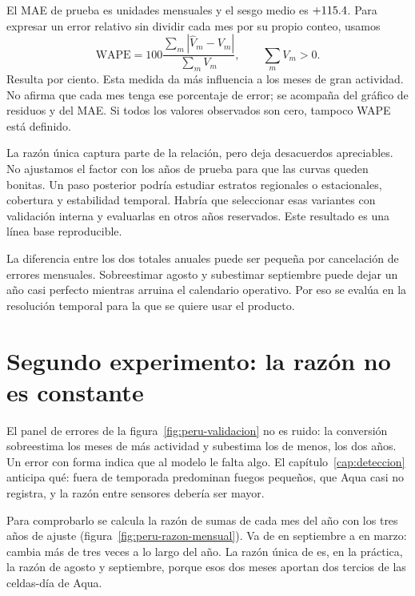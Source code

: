 El MAE de prueba es \PeruMAE{} unidades mensuales y el sesgo medio es
$+\num{115.4}{}$. Para expresar un error relativo sin dividir cada mes por su propio
conteo, usamos
\begin{equation}\label{eq:wape}
 \mathrm{WAPE}=100\frac{\sum_m|\widehat V_m-V_m|}{\sum_m V_m},\qquad \sum_m V_m>0.
\end{equation}
Resulta \PeruWAPE{} por ciento. Esta medida da más influencia a los meses de gran
actividad. No afirma que cada mes tenga ese porcentaje de error; se acompaña del
gráfico de residuos y del MAE. Si todos los valores observados son cero, tampoco WAPE
está definido.

\begin{atencion}
La razón única captura parte de la relación, pero deja desacuerdos apreciables. No
ajustamos el factor con los años de prueba para que las curvas queden bonitas. Un paso
posterior podría estudiar estratos regionales o estacionales, cobertura y estabilidad
temporal. Habría que seleccionar esas variantes con validación interna y evaluarlas en
otros años reservados. Este resultado es una línea base reproducible.
\end{atencion}

La diferencia entre los dos totales anuales puede ser pequeña por cancelación de
errores mensuales. Sobreestimar agosto y subestimar septiembre puede dejar un año casi
perfecto mientras arruina el calendario operativo. Por eso se evalúa en la resolución
temporal para la que se quiere usar el producto.

\FloatBarrier
\section{Segundo experimento: la razón no es constante}\label{sec:peru-modelos}

El panel de errores de la figura~\ref{fig:peru-validacion} no es ruido: la conversión
sobreestima los meses de más actividad y subestima los de menos, los dos años. Un error
con forma indica que al modelo le falta algo. El capítulo~\ref{cap:deteccion} anticipa
qué: fuera de temporada predominan fuegos pequeños, que Aqua casi no registra, y la razón
entre sensores debería ser mayor.

Para comprobarlo se calcula la razón de sumas de cada mes del año con los tres años de
ajuste (figura~\ref{fig:peru-razon-mensual}). Va de \PeruRazonMin{} en septiembre a
\PeruRazonMax{} en marzo: cambia más de tres veces a lo largo del año. La razón única de
\PeruRatio{} es, en la práctica, la razón de agosto y septiembre, porque esos dos meses
aportan dos tercios de las celdas-día de Aqua.

